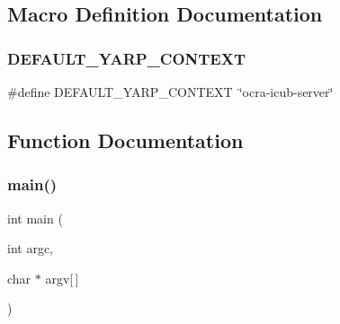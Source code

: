 \subsection{Macro Definition Documentation}
\hypertarget{ocra-icub-server_2src_2main_8cpp_aacf7b13861a4ce37b8dec1979eb6450c}{}\label{ocra-icub-server_2src_2main_8cpp_aacf7b13861a4ce37b8dec1979eb6450c} 
\subsubsection{\texorpdfstring{D\+E\+F\+A\+U\+L\+T\+\_\+\+Y\+A\+R\+P\+\_\+\+C\+O\+N\+T\+E\+XT}{DEFAULT\_YARP\_CONTEXT}}
{\footnotesize\ttfamily \#define D\+E\+F\+A\+U\+L\+T\+\_\+\+Y\+A\+R\+P\+\_\+\+C\+O\+N\+T\+E\+XT~\char`\"{}ocra-\/icub-\/server\char`\"{}}



\subsection{Function Documentation}
\hypertarget{ocra-icub-server_2src_2main_8cpp_a0ddf1224851353fc92bfbff6f499fa97}{}\label{ocra-icub-server_2src_2main_8cpp_a0ddf1224851353fc92bfbff6f499fa97} 
\subsubsection{\texorpdfstring{main()}{main()}}
{\footnotesize\ttfamily int main (\begin{DoxyParamCaption}\item[{int}]{argc,  }\item[{char $\ast$}]{argv\mbox{[}$\,$\mbox{]} }\end{DoxyParamCaption})}

